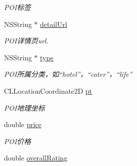 \begin{DoxyCompactItemize}
\begin{DoxyCompactList}\small\item\em P\+O\+I标签 \end{DoxyCompactList}\item 
\hypertarget{interface_b_m_k_poi_detail_result_a8924119cef8b6d48c481d030101b6c56}{N\+S\+String $\ast$ \hyperlink{interface_b_m_k_poi_detail_result_a8924119cef8b6d48c481d030101b6c56}{detail\+Url}}\label{interface_b_m_k_poi_detail_result_a8924119cef8b6d48c481d030101b6c56}

\begin{DoxyCompactList}\small\item\em P\+O\+I详情页url. \end{DoxyCompactList}\item 
\hypertarget{interface_b_m_k_poi_detail_result_abfb97cc8a340caec03111dd31d97e65e}{N\+S\+String $\ast$ \hyperlink{interface_b_m_k_poi_detail_result_abfb97cc8a340caec03111dd31d97e65e}{type}}\label{interface_b_m_k_poi_detail_result_abfb97cc8a340caec03111dd31d97e65e}

\begin{DoxyCompactList}\small\item\em P\+O\+I所属分类，如“hotel”，“cater”，“life” \end{DoxyCompactList}\item 
\hypertarget{interface_b_m_k_poi_detail_result_a3c136c46389101d6709a4b5393c7849c}{C\+L\+Location\+Coordinate2\+D \hyperlink{interface_b_m_k_poi_detail_result_a3c136c46389101d6709a4b5393c7849c}{pt}}\label{interface_b_m_k_poi_detail_result_a3c136c46389101d6709a4b5393c7849c}

\begin{DoxyCompactList}\small\item\em P\+O\+I地理坐标 \end{DoxyCompactList}\item 
\hypertarget{interface_b_m_k_poi_detail_result_afd147e5aaa946583f1873cc650440fa1}{double \hyperlink{interface_b_m_k_poi_detail_result_afd147e5aaa946583f1873cc650440fa1}{price}}\label{interface_b_m_k_poi_detail_result_afd147e5aaa946583f1873cc650440fa1}

\begin{DoxyCompactList}\small\item\em P\+O\+I价格 \end{DoxyCompactList}\item 
\hypertarget{interface_b_m_k_poi_detail_result_a1b23bf2d013b1391ef11074e0d208873}{double \hyperlink{interface_b_m_k_poi_detail_result_a1b23bf2d013b1391ef11074e0d208873}{overall\+Rating}}\label{interface_b_m_k_poi_detail_result_a1b23bf2d013b1391ef11074e0d208873}


\end{DoxyCompactItemize}
